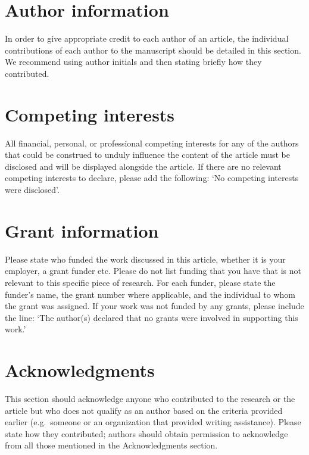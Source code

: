 \documentclass[9pt,a4paper,]{extarticle}
\begin{document}
\hypertarget{author-information}{%
\section{Author information}\label{author-information}}

In order to give appropriate credit to each author of an article, the individual contributions of each author to the manuscript should be detailed in this section. We recommend using author initials and then stating briefly how they contributed.

\hypertarget{competing-interests}{%
\section{Competing interests}\label{competing-interests}}

All financial, personal, or professional competing interests for any of the authors that could be construed to unduly influence the content of the article must be disclosed and will be displayed alongside the article. If there are no relevant competing interests to declare, please add the following: `No competing interests were disclosed'.

\hypertarget{grant-information}{%
\section{Grant information}\label{grant-information}}

Please state who funded the work discussed in this article, whether it is your employer, a grant funder etc. Please do not list funding that you have that is not relevant to this specific piece of research. For each funder, please state the funder's name, the grant number where applicable, and the individual to whom the grant was assigned. If your work was not funded by any grants, please include the line: `The author(s) declared that no grants were involved in supporting this work.'

\hypertarget{acknowledgments}{%
\section{Acknowledgments}\label{acknowledgments}}

This section should acknowledge anyone who contributed to the research or the article but who does not qualify as an author based on the criteria provided earlier (e.g.~someone or an organization that provided writing assistance). Please state how they contributed; authors should obtain permission to acknowledge from all those mentioned in the Acknowledgments section.
\end{document}

